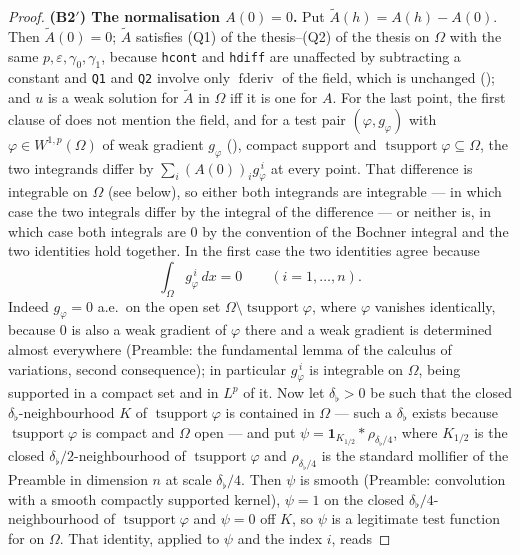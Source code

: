 \begin{proof}
\textbf{(B2$'$) The normalisation $A(0)=0$.}  Put $\widetilde A(h)=A(h)-A(0)$.
Then $\widetilde A(0)=0$; $\widetilde A$ satisfies
(Q1) of the thesis--(Q2) of the thesis on $\Omega$ with the same
$p,\varepsilon,\gamma_0,\gamma_1$, because \texttt{hcont} and \texttt{hdiff} are
unaffected by subtracting a constant and \texttt{Q1} and \texttt{Q2} involve
only $\operatorname{fderiv}$ of the field, which is unchanged
(); and $u$ is a weak solution for
$\widetilde A$ in $\Omega$ iff it is one for $A$.  For the last point, the first
clause of  does not mention the field, and for a test
pair $(\varphi,g_\varphi)$ with $\varphi\in W^{1,p}(\Omega)$ of weak gradient
$g_\varphi$ (), compact support and
$\operatorname{tsupport}\varphi\subseteq\Omega$, the two integrands differ by
$\sum_i(A(0))_ig_\varphi^{\,i}$ at every point.  That difference is integrable
on $\Omega$ (see below), so either both integrands are integrable --- in which
case the two integrals differ by the integral of the difference --- or neither
is, in which case both integrals are $0$ by the convention of the Bochner
integral and the two identities hold together.  In the first case the two
identities agree because
\[
\int_\Omega g_\varphi^{\,i}\,dx=0\qquad(i=1,\dots,n).
\]
Indeed $g_\varphi=0$ a.e.\ on the open set
$\Omega\setminus\operatorname{tsupport}\varphi$, where $\varphi$ vanishes
identically, because $0$ is also a weak gradient of $\varphi$ there and a weak
gradient is determined almost everywhere (Preamble: the fundamental lemma of the
calculus of variations, second consequence); in particular $g_\varphi^{\,i}$ is
integrable on $\Omega$, being supported in a compact set and in $L^p$ of it.
Now let $\delta_\flat>0$ be such that the closed
$\delta_\flat$-neighbourhood $K$ of $\operatorname{tsupport}\varphi$ is
contained in $\Omega$ --- such a $\delta_\flat$ exists because
$\operatorname{tsupport}\varphi$ is compact and $\Omega$ open --- and put
$\psi=\mathbf1_{K_{1/2}}*\rho_{\delta_\flat/4}$, where $K_{1/2}$ is the closed
$\delta_\flat/2$-neighbourhood of $\operatorname{tsupport}\varphi$ and
$\rho_{\delta_\flat/4}$ is the standard mollifier of the Preamble in dimension
$n$ at scale $\delta_\flat/4$.  Then $\psi$ is smooth (Preamble:
convolution with a smooth compactly supported kernel), $\psi=1$ on the closed
$\delta_\flat/4$-neighbourhood of $\operatorname{tsupport}\varphi$ and
$\psi=0$ off $K$, so $\psi$ is a legitimate test function for
 on $\Omega$.  That identity, applied to $\psi$ and
the index $i$, reads

\end{proof}
